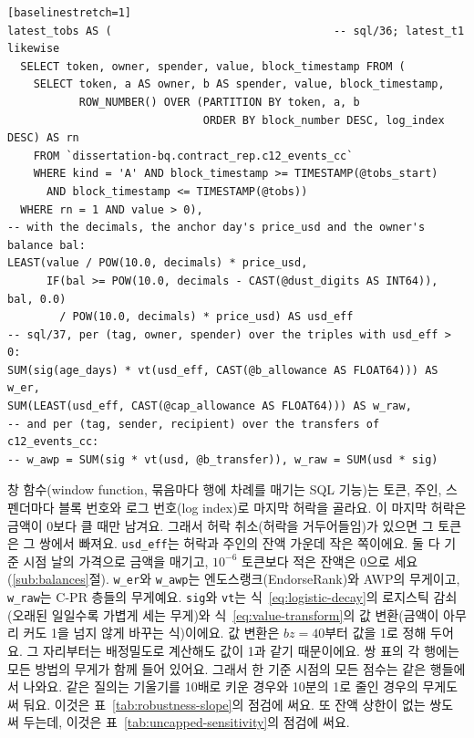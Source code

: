\begin{verbatim}[baselinestretch=1]
latest_tobs AS (                                  -- sql/36; latest_t1 likewise
  SELECT token, owner, spender, value, block_timestamp FROM (
    SELECT token, a AS owner, b AS spender, value, block_timestamp,
           ROW_NUMBER() OVER (PARTITION BY token, a, b
                              ORDER BY block_number DESC, log_index DESC) AS rn
    FROM `dissertation-bq.contract_rep.c12_events_cc`
    WHERE kind = 'A' AND block_timestamp >= TIMESTAMP(@tobs_start)
      AND block_timestamp <= TIMESTAMP(@tobs))
  WHERE rn = 1 AND value > 0),
-- with the decimals, the anchor day's price_usd and the owner's balance bal:
LEAST(value / POW(10.0, decimals) * price_usd,
      IF(bal >= POW(10.0, decimals - CAST(@dust_digits AS INT64)), bal, 0.0)
        / POW(10.0, decimals) * price_usd) AS usd_eff
-- sql/37, per (tag, owner, spender) over the triples with usd_eff > 0:
SUM(sig(age_days) * vt(usd_eff, CAST(@b_allowance AS FLOAT64))) AS w_er,
SUM(LEAST(usd_eff, CAST(@cap_allowance AS FLOAT64))) AS w_raw,
-- and per (tag, sender, recipient) over the transfers of c12_events_cc:
-- w_awp = SUM(sig * vt(usd, @b_transfer)), w_raw = SUM(usd * sig)
\end{verbatim}

창 함수(window function, 묶음마다 행에 차례를 매기는 SQL 기능)는 토큰, 주인, 스펜더마다 블록 번호와 로그 번호(log index)로 마지막 허락을 골라요. 이 마지막 허락은 금액이 0보다 클 때만 남겨요. 그래서 허락 취소(허락을 거두어들임)가 있으면 그 토큰은 그 쌍에서 빠져요. \texttt{usd\_eff}는 허락과 주인의 잔액 가운데 작은 쪽이에요. 둘 다 기준 시점 날의 가격으로 금액을 매기고, $10^{-6}$ 토큰보다 적은 잔액은 0으로 세요(\ref{sub:balances}절). \texttt{w\_er}와 \texttt{w\_awp}는 엔도스랭크(EndorseRank)와 AWP의 무게이고, \texttt{w\_raw}는 \mbox{C-PR} 층들의 무게예요. \texttt{sig}와 \texttt{vt}는 식~\eqref{eq:logistic-decay}의 로지스틱 감쇠(오래된 일일수록 가볍게 세는 무게)와 식~\eqref{eq:value-transform}의 값 변환(금액이 아무리 커도 1을 넘지 않게 바꾸는 식)이에요. 값 변환은 $bz=40$부터 값을 1로 정해 두어요. 그 자리부터는 배정밀도로 계산해도 값이 1과 같기 때문이에요. 쌍 표의 각 행에는 모든 방법의 무게가 함께 들어 있어요. 그래서 한 기준 시점의 모든 점수는 같은 행들에서 나와요. 같은 질의는 기울기를 10배로 키운 경우와 10분의 1로 줄인 경우의 무게도 써 둬요. 이것은 표~\ref{tab:robustness-slope}의 점검에 써요. 또 잔액 상한이 없는 쌍도 써 두는데, 이것은 표~\ref{tab:uncapped-sensitivity}의 점검에 써요.
